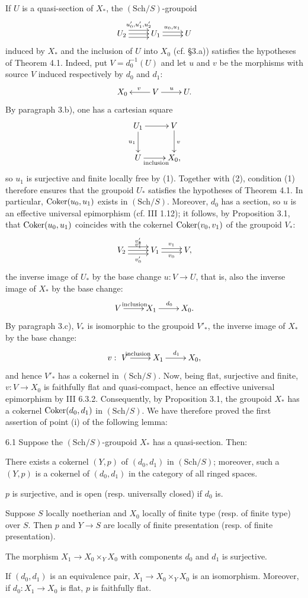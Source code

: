 If $U$ is a quasi-section of $X_*$, the $(\mathrm{Sch}/S)$-groupoid
\[
\xymatrix{U_2\ar@<1ex>[r]^{u'_0,u'_1,u'_2}\ar[r]\ar@<-1ex>[r]&U_1\ar@<.5ex>[r]^{u_0,u_1}\ar@<-.5ex>[r]&U}
\]
induced by $X_*$ and the inclusion of $U$ into $X_0$ (cf. §3.a)) satisfies the hypotheses of Theorem 4.1. Indeed, put $V=d_0^{-1}(U)$ and let $u$ and $v$ be the morphisms with source $V$ induced respectively by $d_0$ and $d_1$:
\[
\xymatrix{X_0&V\ar[l]_v\ar[r]^u&U.}
\]
By paragraph 3.b), one has a cartesian square
\[
\xymatrix{U_1\ar[r]\ar[d]_{u_1}&V\ar[d]^v\\U\ar[r]_{\text{inclusion}}&X_0,}
\]
so $u_1$ is surjective and finite locally free by (1). Together with (2), condition (1) therefore ensures that the groupoid $U_*$ satisfies the hypotheses of Theorem 4.1. In particular, $\operatorname{Coker}(u_0,u_1)$ exists in $(\mathrm{Sch}/S)$. Moreover, $d_0$ has a section, so $u$ is an effective universal epimorphism (cf. III 1.12); it follows, by Proposition 3.1, that $\operatorname{Coker}(u_0,u_1)$ coincides with the cokernel $\operatorname{Coker}(v_0,v_1)$ of the groupoid $V_*$:
\[
\xymatrix{V_2\ar@<1ex>[r]^{v'_2}\ar[r]^{v'_1}\ar@<-1ex>[r]_{v'_0}&V_1\ar@<.5ex>[r]^{v_1}\ar@<-.5ex>[r]_{v_0}&V,}
\]
the inverse image of $U_*$ by the base change $u:V\to U$, that is, also the inverse image of $X_*$ by the base change:
\[
\xymatrix{V\ar[r]^{\text{inclusion}}&X_1\ar[r]^{d_0}&X_0.}
\]
By paragraph 3.c), $V_*$ is isomorphic to the groupoid $V'_*$, the inverse image of $X_*$ by the base change:
\[
\xymatrix{v:\ V\ar[r]^{\text{inclusion}}&X_1\ar[r]^{d_1}&X_0,}
\]
and hence $V'_*$ has a cokernel in $(\mathrm{Sch}/S)$. Now, being flat, surjective and finite, $v:V\to X_0$ is faithfully flat and quasi-compact, hence an effective universal epimorphism by III 6.3.2. Consequently, by Proposition 3.1, the groupoid $X_*$ has a cokernel $\operatorname{Coker}(d_0,d_1)$ in $(\mathrm{Sch}/S)$. We have therefore proved the first assertion of point (i) of the following lemma:
\begin{lemma}{6.1}\label{V.6.1}
Suppose the $(\mathrm{Sch}/S)$-groupoid $X_*$ has a quasi-section. Then:
\begin{enumeratei}
\item There exists a cokernel $(Y,p)$ of $(d_0,d_1)$ in $(\mathrm{Sch}/S)$; moreover, such a $(Y,p)$ is a cokernel of $(d_0,d_1)$ in the category of all ringed spaces.
\item[(i')] $p$ is surjective, and is open (resp. universally closed) if $d_0$ is.
\item Suppose $S$ locally noetherian and $X_0$ locally of finite type (resp. of finite type) over $S$. Then $p$ and $Y\to S$ are locally of finite presentation (resp. of finite presentation).
\item The morphism $X_1\to X_0\times_YX_0$ with components $d_0$ and $d_1$ is surjective.
\item If $(d_0,d_1)$ is an equivalence pair, $X_1\to X_0\times_YX_0$ is an isomorphism. Moreover, if $d_0:X_1\to X_0$ is flat, $p$ is faithfully flat.
\end{enumeratei}
\end{lemma}
